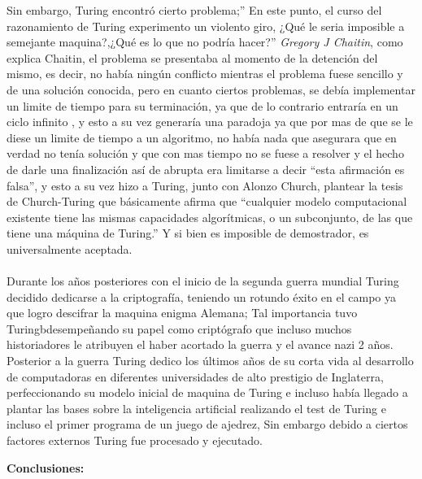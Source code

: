 \documentclass[12pt]{article}
\begin{document}
Sin embargo, Turing encontró cierto problema;” En este punto, el curso del razonamiento de Turing experimento un violento giro, ¿Qué le seria imposible a semejante maquina?,¿Qué es lo que no podría hacer?” \emph{Gregory J Chaitin}, como explica Chaitin, el problema se presentaba al momento de la detención del mismo, es decir, no había ningún conflicto mientras el problema fuese sencillo y de una solución conocida, pero en cuanto ciertos problemas, se debía implementar un limite de tiempo para su terminación, ya que de lo contrario entraría en un ciclo infinito , y esto a su vez generaría una paradoja ya que por mas de que se le diese un limite de tiempo a un algoritmo, no había nada que asegurara que en verdad no tenía solución y que con mas tiempo no se fuese a resolver y el hecho de darle una finalización así de abrupta era limitarse a decir “esta afirmación es falsa”, y esto a su vez  hizo a Turing, junto con Alonzo Church, plantear la tesis de Church-Turing que básicamente afirma que “cualquier modelo computacional existente tiene las mismas capacidades algorítmicas, o un subconjunto, de las que tiene una máquina de Turing.” Y si bien es imposible de demostrador, es universalmente aceptada.\\\\
Durante los años posteriores con el inicio de la segunda guerra mundial Turing decidido dedicarse a la criptografía, teniendo un rotundo éxito en el campo ya que logro descifrar la maquina enigma Alemana; Tal importancia tuvo Turingbdesempeñando su papel como criptógrafo que incluso muchos historiadores le atribuyen el haber acortado la guerra y el avance nazi 2 años. Posterior a la guerra Turing dedico los últimos años de su corta vida al desarrollo de computadoras en diferentes universidades de alto prestigio de Inglaterra, perfeccionando su modelo inicial de maquina de Turing e incluso había llegado a plantar las bases sobre la inteligencia artificial realizando el test de Turing e incluso el primer programa de un juego de ajedrez, Sin embargo debido a ciertos factores externos Turing fue procesado y ejecutado.



\begin{center}
\bf{\sc\Huge Conclusiones: }\\
\end{center}
\vspace{50pt}
\end{document}
